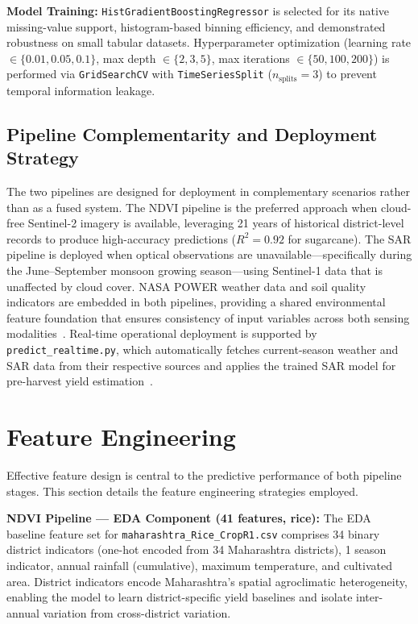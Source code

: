 \documentclass[conference]{IEEEtran}
\begin{document}
\textbf{Model Training:} \texttt{HistGradientBoostingRegressor} is selected
for its native missing-value support, histogram-based binning efficiency,
and demonstrated robustness on small tabular datasets. Hyperparameter
optimization (learning rate $\in \{0.01, 0.05, 0.1\}$, max depth
$\in \{2, 3, 5\}$, max iterations $\in \{50, 100, 200\}$) is performed via
\texttt{GridSearchCV} with \texttt{TimeSeriesSplit} ($n_\text{splits} = 3$)
to prevent temporal information leakage.

\subsection{Pipeline Complementarity and Deployment Strategy}

The two pipelines are designed for deployment in complementary scenarios
rather than as a fused system. The NDVI pipeline is the preferred approach
when cloud-free Sentinel-2 imagery is available, leveraging 21 years of
historical district-level records to produce high-accuracy predictions
($R^2 = 0.92$ for sugarcane). The SAR pipeline is deployed when optical
observations are unavailable---specifically during the June--September monsoon
growing season---using Sentinel-1 data that is unaffected by cloud cover.
NASA POWER weather data and soil quality indicators are embedded in both
pipelines, providing a shared environmental feature foundation that ensures
consistency of input variables across both sensing modalities~\cite{narimani2026}.
Real-time operational deployment is supported by \texttt{predict\_realtime.py},
which automatically fetches current-season weather and SAR data from their
respective sources and applies the trained SAR model for pre-harvest
yield estimation~\cite{esa2022}.

\section{Feature Engineering}

Effective feature design is central to the predictive performance of both
pipeline stages. This section details the feature engineering strategies
employed.

\textbf{NDVI Pipeline --- EDA Component (41 features, rice):} The EDA
baseline feature set for \texttt{maharashtra\_Rice\_CropR1.csv} comprises
34 binary district indicators (one-hot encoded from 34 Maharashtra districts),
1 season indicator, annual rainfall (cumulative), maximum temperature, and
cultivated area. District indicators encode Maharashtra's spatial agroclimatic
heterogeneity, enabling the model to learn district-specific yield baselines
and isolate inter-annual variation from cross-district variation.
\end{document}
